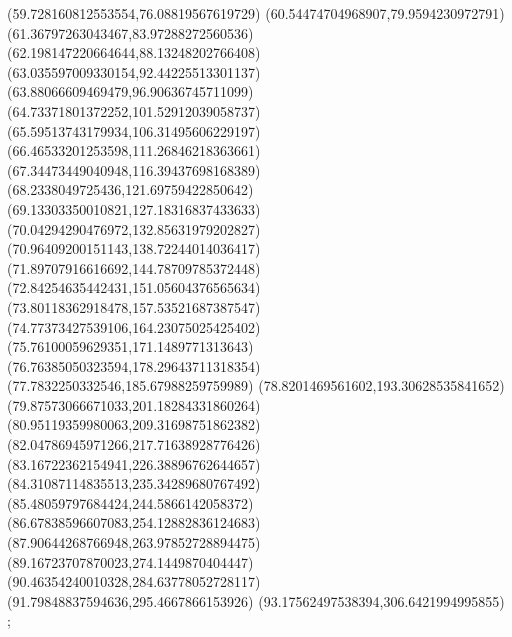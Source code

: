 {(59.728160812553554,76.08819567619729)
(60.54474704968907,79.9594230972791)
(61.36797263043467,83.97288272560536)
(62.198147220664644,88.13248202766408)
(63.035597009330154,92.44225513301137)
(63.88066609469479,96.90636745711099)
(64.73371801372252,101.52912039058737)
(65.59513743179934,106.31495606229197)
(66.46533201253598,111.26846218363661)
(67.34473449040948,116.39437698168389)
(68.2338049725436,121.69759422850642)
(69.13303350010821,127.18316837433633)
(70.04294290476972,132.85631979202827)
(70.96409200151143,138.72244014036417)
(71.89707916616692,144.78709785372448)
(72.84254635442431,151.05604376565634)
(73.80118362918478,157.53521687387547)
(74.77373427539106,164.23075025425402)
(75.76100059629351,171.1489771313643)
(76.76385050323594,178.29643711318354)
(77.7832250332546,185.67988259759989)
(78.8201469561602,193.30628535841652)
(79.87573066671033,201.18284331860264)
(80.95119359980063,209.31698751862382)
(82.04786945971266,217.71638928776426)
(83.16722362154941,226.38896762644657)
(84.31087114835513,235.34289680767492)
(85.48059797684424,244.5866142058372)
(86.67838596607083,254.12882836124683)
(87.90644268766948,263.97852728894475)
(89.16723707870023,274.1449870404447)
(90.46354240010328,284.63778052728117)
(91.79848837594636,295.4667866153926)
(93.17562497538394,306.6421994995855)
};

